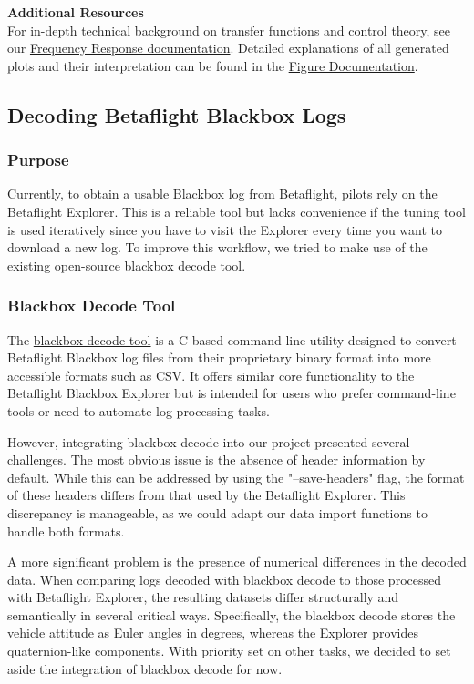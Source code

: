 \documentclass[a4paper,11pt]{scrartcl}
\begin{document}
\textbf{Additional Resources}\\
For in-depth technical background on transfer functions and control theory, see our \href{https://github.com/InsaneBroccoli/bf_controller_tuning/tree/main/markdown/Frequency_Response}{Frequency Response documentation}.
Detailed explanations of all generated plots and their interpretation can be found in the \href{https://github.com/InsaneBroccoli/bf_controller_tuning/tree/main/markdown/Descriptions_Figures}{Figure Documentation}.


\clearpage

\subsection{Decoding Betaflight Blackbox Logs}
\subsubsection*{Purpose}
Currently, to obtain a usable Blackbox log from Betaflight, pilots rely on the Betaflight Explorer.
This is a reliable tool but lacks convenience if the tuning tool is used iteratively since you have to visit the Explorer every time you want to download a new log.
To improve this workflow, we tried to make use of the existing open-source blackbox decode tool.

\subsubsection*{Blackbox Decode Tool}
The \href{https://github.com/betaflight/blackbox-tools/}{blackbox decode tool} is a C-based command-line utility designed to convert Betaflight Blackbox log files from their proprietary binary format into more accessible formats such as CSV.
It offers similar core functionality to the Betaflight Blackbox Explorer but is intended for users who prefer command-line tools or need to automate log processing tasks.\par

However, integrating blackbox decode into our project presented several challenges.
The most obvious issue is the absence of header information by default.
While this can be addressed by using the "--save-headers" flag, the format of these headers differs from that used by the Betaflight Explorer.
This discrepancy is manageable, as we could adapt our data import functions to handle both formats.\par

A more significant problem is the presence of numerical differences in the decoded data.
When comparing logs decoded with blackbox decode to those processed with Betaflight Explorer, the resulting datasets differ structurally and semantically in several critical ways.
Specifically, the blackbox decode stores the vehicle attitude as Euler angles in degrees, whereas the Explorer provides quaternion-like components.
With priority set on other tasks, we decided to set aside the integration of blackbox decode for now.
\end{document}
